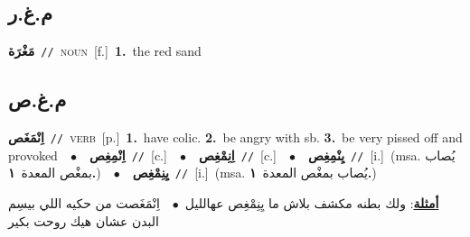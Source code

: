 \documentclass[10pt,a4paper,twoside]{article} %
\begin{document}
\begin{multicols}{2}
\vspace{-3mm}
\subsection*{\color{blue}\foreignlanguage{arabic}{م.غ.ر}\color{blue}{}} 

{\setlength\topsep{0pt}\textbf{\foreignlanguage{arabic}{مَغْرَة}}\ {\color{gray}\texttt{//}\color{black}}\ \textsc{noun}\ [f.]\ \textbf{1.}~the red sand\ } \vspace{2mm}

\vspace{-3mm}
\subsection*{\color{blue}\foreignlanguage{arabic}{م.غ.ص}\color{blue}{}} 

{\setlength\topsep{0pt}\textbf{\foreignlanguage{arabic}{اِنْمَغَص}}\ {\color{gray}\texttt{//}\color{black}}\ \textsc{verb}\ [p.]\ \textbf{1.}~have colic.  \textbf{2.}~be angry with sb.  \textbf{3.}~be very pissed off and provoked\ \ $\bullet$\ \ \setlength\topsep{0pt}\textbf{\foreignlanguage{arabic}{اِنْمِغِص}}\ {\color{gray}\texttt{//}\color{black}}\ [c.]\ \ $\bullet$\ \ \setlength\topsep{0pt}\textbf{\foreignlanguage{arabic}{اِنِمْغِص}}\ {\color{gray}\texttt{//}\color{black}}\ [c.]\ \ $\bullet$\ \ \setlength\topsep{0pt}\textbf{\foreignlanguage{arabic}{يِنْمِغِص}}\ {\color{gray}\texttt{//}\color{black}}\ [i.]\ \color{gray}(msa. \foreignlanguage{arabic}{يُصاب بمغْص المعدة}~\foreignlanguage{arabic}{\textbf{١.}})\color{black}\ \ $\bullet$\ \ \setlength\topsep{0pt}\textbf{\foreignlanguage{arabic}{يِنِمْغِص}}\ {\color{gray}\texttt{//}\color{black}}\ [i.]\ \color{gray}(msa. \foreignlanguage{arabic}{يُصاب بمغْص المعدة}~\foreignlanguage{arabic}{\textbf{١.}})\color{black}\  \begin{flushright}\color{gray}\foreignlanguage{arabic}{\textbf{\underline{\foreignlanguage{arabic}{أمثلة}}}: ولك بطنه مكشف بلاش ما يِنِمْغِص عهالليل\ $\bullet$\ \  اِنْمَغَصت من حكيه اللي بيسِم البدن عشان هيك روحت بكير}\end{flushright}\color{black}} \vspace{2mm}


\end{multicols}
\end{document}
